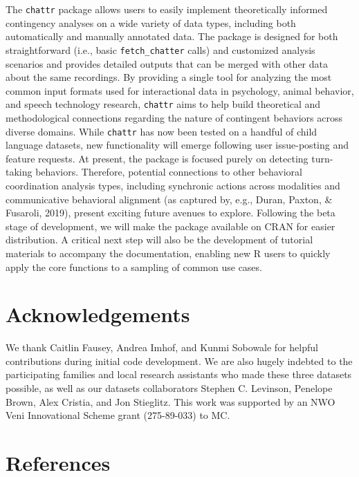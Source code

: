 \documentclass[10pt, letterpaper]{article}
\begin{document}
The \texttt{chattr} package allows users to easily implement
theoretically informed contingency analyses on a wide variety of data
types, including both automatically and manually annotated data. The
package is designed for both straightforward (i.e., basic
\texttt{fetch\_chatter} calls) and customized analysis scenarios and
provides detailed outputs that can be merged with other data about the
same recordings. By providing a single tool for analyzing the most
common input formats used for interactional data in psychology, animal
behavior, and speech technology research, \texttt{chattr} aims to help
build theoretical and methodological connections regarding the nature of
contingent behaviors across diverse domains. While \texttt{chattr} has
now been tested on a handful of child language datasets, new
functionality will emerge following user issue-posting and feature
requests. At present, the package is focused purely on detecting
turn-taking behaviors. Therefore, potential connections to other
behavioral coordination analysis types, including synchronic actions
across modalities and communicative behavioral alignment (as captured
by, e.g., Duran, Paxton, \& Fusaroli, 2019), present exciting future
avenues to explore. Following the beta stage of development, we will
make the package available on CRAN for easier distribution. A critical
next step will also be the development of tutorial materials to
accompany the documentation, enabling new R users to quickly apply the
core functions to a sampling of common use cases.

\hypertarget{acknowledgements}{%
\section{Acknowledgements}\label{acknowledgements}}

We thank Caitlin Fausey, Andrea Imhof, and Kunmi Sobowale for helpful
contributions during initial code development. We are also hugely
indebted to the participating families and local research assistants who
made these three datasets possible, as well as our datasets
collaborators Stephen C. Levinson, Penelope Brown, Alex Cristia, and Jon
Stieglitz. This work was supported by an NWO Veni Innovational Scheme
grant (275-89-033) to MC.

\hypertarget{references}{%
\section{References}\label{references}}
\end{document}
